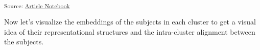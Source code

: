 \documentclass[
  authoryear]{elsarticle}
\begin{document}
\textsubscript{Source:
\href{https://m-delem.github.io/2499-similarity-manuscript/index.qmd.html}{Article
Notebook}}

Now let's visualize the embeddings of the subjects in each cluster to
get a visual idea of their representational structures and the
intra-cluster alignment between the subjects.

\begin{figure}

\begin{minipage}{0.33\linewidth}



\end{minipage}%
%
\begin{minipage}{0.33\linewidth}

\end{minipage}
\end{figure}
\end{document}
